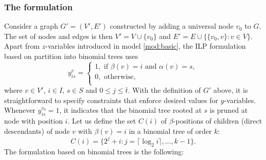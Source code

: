 \subsubsection{The formulation}
Consider a graph $G'=(V',E')$ constructed  by adding a universal node $v_0$ to $G$.
The set of nodes and edges is then $V'=V\cup \{v_0\}$ and $E'=E\cup\{\{v_0,v\}:v\in V\}$.
Apart from $z$-variables introduced in model \eqref{mod:basic}, the ILP formulation based on partition into binomial trees uses
$$
y_{is}^v=\begin{cases}
1, \text{ if } \beta(v)=i \text{ and } \alpha(v)=s,\\
0, \text{ otherwise},\\
\end{cases}
$$
where $v\in V'$, $i\in I$, $s\in S$ and $0\leq j\leq \bar{t}$.
With the definition of $G'$ above, it is straightforward to specify constraints that enforce desired values for $y$-variables.
Whenever $y_{is}^{v_0}=1$, it indicates that the binomial tree rooted at $s$ is pruned at node with position $i$.
Let us define the set $C(i)$ of $\beta$-positions of children (direct descendants) of node $v$ with $\beta(v)=i$ in a binomial tree of order $k$:
\begin{equation}
\label{eq:c1}
C(i)=\{2^j+i:j=\lceil\log_2 i\rceil,\dots,k-1\}.
\end{equation}
The formulation based on binomial trees is the following:
